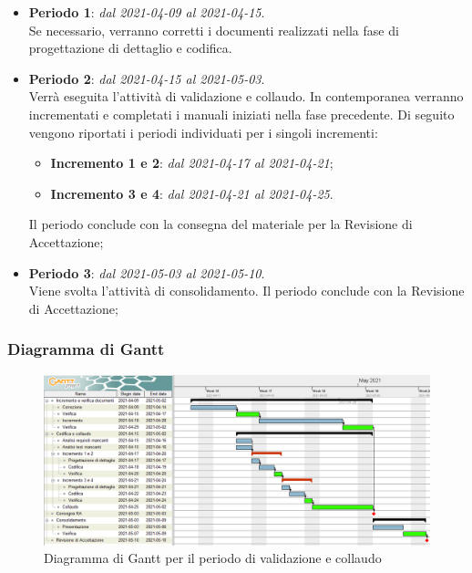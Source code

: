 \begin{itemize}
\item \textbf{Periodo 1}: \textit{dal 2021-04-09 al 2021-04-15}. \\
Se necessario, verranno corretti i documenti realizzati nella fase di progettazione di dettaglio e codifica.
\item \textbf{Periodo 2}: \textit{dal 2021-04-15 al 2021-05-03}. \\
Verrà eseguita l'attività di validazione e collaudo. In contemporanea verranno incrementati e completati i manuali iniziati nella fase precedente. Di seguito vengono riportati i periodi individuati per i singoli incrementi:
\begin{itemize}
\item \textbf{Incremento 1 e 2}: \textit{dal 2021-04-17 al 2021-04-21};
\item \textbf{Incremento 3 e 4}: \textit{dal 2021-04-21 al 2021-04-25}.
\end{itemize}
Il periodo conclude con la consegna del materiale per la Revisione di Accettazione;
\item \textbf{Periodo 3}: \textit{dal 2021-05-03 al 2021-05-10}. \\
Viene svolta l'attività di consolidamento. Il periodo conclude con la Revisione di Accettazione;
\end{itemize}

\subsubsection{Diagramma di Gantt}

\begin{figure}[H]
\centering

\centerline{\includegraphics[scale=0.6]{res/Pianificazione/Gantt/verifica}}
\caption{Diagramma di Gantt per il periodo di validazione e collaudo}
\end{figure}